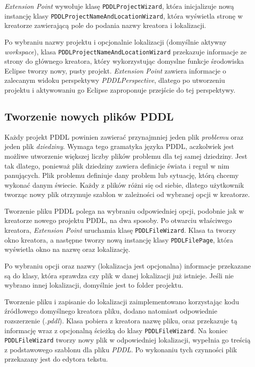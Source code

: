 \emph{Extension Point} wywołuje klasę \texttt{PDDLProjectWizard}, która inicjalizuje nową instancję klasy \texttt{PDDLProjectNameAndLocationWizard}, która wyświetla stronę w kreatorze zawierającą pole do podania nazwy kreatora i lokalizacji. 

Po wybraniu nazwy projektu i opcjonalnie lokalizacji (domyślnie aktywny \emph{workspace}), klasa \texttt{PDDLProjectNameAndLocationWizard} przekazuje informacje ze strony do głównego kreatora, który wykorzystując domyslne funkcje środowiska Eclipse tworzy nowy, pusty projekt. \emph{Extension Point} zawiera informacje o zalecanym widoku perspektywy \emph{PDDLPerspective}, dlatego po utworzeniu projektu i aktywowaniu go Eclipse zaproponuje przejście do tej perspektywy.


\subsection{Tworzenie nowych plików PDDL}
Każdy projekt PDDL powinien zawierać przynajmniej jeden plik \emph{problemu} oraz jeden plik \emph{dziedziny}. Wymaga tego gramatyka języka PDDL, aczkolwiek jest możliwe utworzenie większej liczby plików problemu dla tej samej dziedziny. Jest tak dlatego, ponieważ plik dziedziny zawiera definicje świata i reguł w nim panujących. Plik problemu definiuje dany problem lub sytuację, którą chcemy wykonać danym świecie. Każdy z plików różni się od siebie, dlatego użytkownik tworząc nowy plik otrzymuje szablon w zależności od wybranej opcji w kreatorze. 

Tworzenie pliku PDDL polega na wybraniu odpowiedniej opcji, podobnie jak w kreatorze nowego projektu PDDL, na dwa sposoby. Po otwarciu właściwego kreatora, \emph{Extension Point} uruchamia klasę \texttt{PDDLFileWizard}. Klasa ta tworzy okno kreatora, a następne tworzy nową instancję klasy \texttt{PDDLFilePage}, która wyświetla okno na nazwę oraz lokalizację.

Po wybraniu opcji oraz nazwy (lokalizacja jest opcjonalna) informacje przekazane są do klasy, która sprawdza czy plik w danej lokalizacji już istnieje. Jeśli nie wybrano innej lokalizacji, domyślnie jest to folder projektu.
 
Tworzenie pliku i zapisanie do lokalizacji zaimplementowano korzystając kodu źródłowego domyślnego kreatora pliku, dodano natomiast odpowiednie rozszerzenie (\emph{.pddl}). Klasa pobiera z kreatora nazwę pliku, oraz przekazuje tą informację wraz z opcjonalną ścieżką do klasy \texttt{PDDLFileWizard}. Na koniec \texttt{PDDLFileWizard} tworzy nowy plik w odpowiedniej lokalizacji, wypełnia go treścią z podstawowego szablonu dla pliku \emph{PDDL}. Po wykonaniu tych czynności plik przekazany jest do edytora tekstu.

